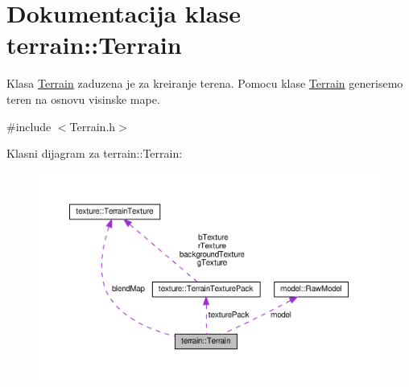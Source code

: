 \hypertarget{classterrain_1_1Terrain}{}\section{Dokumentacija klase terrain\+:\+:Terrain}
\label{classterrain_1_1Terrain}


Klasa \hyperlink{classterrain_1_1Terrain}{Terrain} zaduzena je za kreiranje terena. Pomocu klase \hyperlink{classterrain_1_1Terrain}{Terrain} generisemo teren na osnovu visinske mape.  




{\ttfamily \#include $<$Terrain.\+h$>$}



Klasni dijagram za terrain\+:\+:Terrain\+:\nopagebreak
\begin{figure}[H]
\begin{center}
\leavevmode
\includegraphics[width=350pt]{classterrain_1_1Terrain__coll__graph}
\end{center}
\end{figure}
